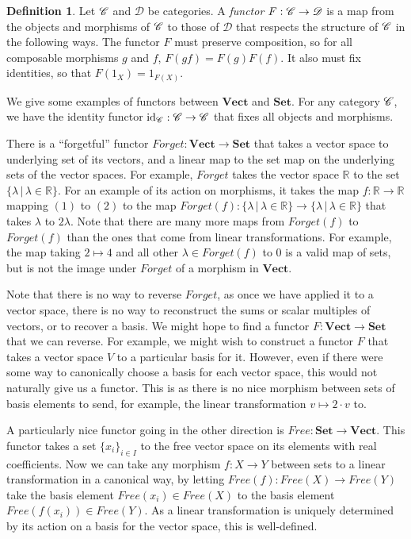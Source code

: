 \documentclass[a4paper,11pt,leqno]{article} \usepackage{amsmath}
\newcommand{\RR}{\mathbb{R}} \newcommand{\QQ}{\mathbb{Q}}
\newcommand{\curD}{\mathscr{D}} \newcommand{\curI}{\mathscr{I}}
\newcommand{\id}{\ensuremath{\operatorname{id}}}
\theoremstyle{definition}
\newtheorem{defn}{Definition}
\begin{document}
\begin{defn}
  Let $\mathscr{C}$ and $\curD$ be categories.
  A \emph{functor} $F: \curC\to \curD$ is a map from the objects and morphisms
  of $\mathscr{C}$ to those of $\curD$ that respects the structure of $\mathscr{C}$ in the
  following ways.
  The functor $F$ must preserve composition, so for all composable morphisms
  $g$ and $f$, $F(gf) = F(g)F(f)$.
  It also must fix identities, so that $F(1_X) = 1_{F(X)}$.
\end{defn}

We give some examples of functors between $\textbf{Vect}$ and $\textbf{Set}$.
For any category $\mathscr{C}$, we have the identity functor $\id_{\curC}:
\curC\to \curC$ that fixes all objects and morphisms.

There is a ``forgetful'' functor $Forget: \textbf{Vect}\to \textbf{Set}$ that
takes a vector space to underlying set of its vectors, and a linear map to the
set map on the underlying sets of the vector spaces.
For example, $Forget$ takes the vector space $\RR$ to the set $\{\lambda\,|\,
\lambda\in\RR\}$.
For an example of its action on morphisms, it takes the map $f: \RR\to\RR$
mapping $(1)$ to $(2)$ to the map
$Forget(f): \{\lambda\,|\,\lambda\in\RR\}\to \{\lambda\,|\,\lambda\in\RR\}$
that takes $\lambda$ to $2\lambda$.
Note that there are many more maps from $Forget(f)$ to $Forget(f)$ than the
ones that come from linear transformations.
For example, the map taking $2\mapsto 4$ and all other $\lambda\in Forget(f)$
to $0$ is a valid map of sets, but is not the image under $Forget$ of
a morphism in $\textbf{Vect}$.

Note that there is no way to reverse $Forget$, as once we have applied it to
a vector space, there is no way to reconstruct the sums or scalar multiples of
vectors, or to recover a basis.
We might hope to find a functor $F: \textbf{Vect}\to\textbf{Set}$ that we can
reverse.
For example, we might wish to construct a functor $F$ that takes a vector space
$V$ to a particular basis for it.
However, even if there were some way to canonically choose a basis for each
vector space, this would not naturally give us a functor.
This is as there is no nice morphism between sets of basis elements to send,
for example, the linear transformation $v\mapsto 2\cdot v$ to.

A particularly nice functor going in the other direction is $Free:
\textbf{Set}\to \textbf{Vect}$.
This functor takes a set $\{x_i\}_{i\in I}$ to the free vector space on its
elements with real coefficients.
Now we can take any morphism $f: X\to Y$ between sets to a linear
transformation in a canonical way, by letting $Free(f): Free(X)\to Free(Y)$
take the basis element $Free(x_i)\in Free(X)$ to the basis element
$Free(f(x_i))\in Free(Y)$.
As a linear transformation is uniquely determined by its action on a basis for
the vector space, this is well-defined.
\end{document}
